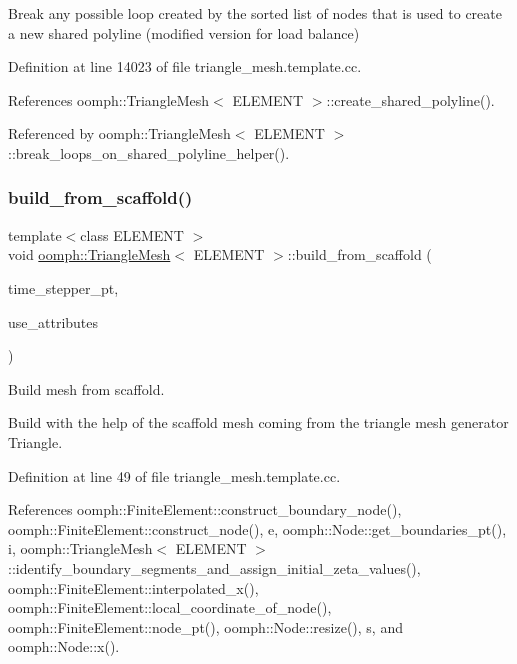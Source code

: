 Break any possible loop created by the sorted list of nodes that is used to create a new shared polyline (modified version for load balance) 



Definition at line 14023 of file triangle\+\_\+mesh.\+template.\+cc.



References oomph\+::\+Triangle\+Mesh$<$ E\+L\+E\+M\+E\+N\+T $>$\+::create\+\_\+shared\+\_\+polyline().



Referenced by oomph\+::\+Triangle\+Mesh$<$ E\+L\+E\+M\+E\+N\+T $>$\+::break\+\_\+loops\+\_\+on\+\_\+shared\+\_\+polyline\+\_\+helper().

\mbox{\label{classoomph_1_1TriangleMesh_a82ccf74f4e2befe3a6acd458d4e37c35}} 
\subsubsection{\texorpdfstring{build\+\_\+from\+\_\+scaffold()}{build\_from\_scaffold()}}
{\footnotesize\ttfamily template$<$class E\+L\+E\+M\+E\+NT $>$ \\
void \hyperlink{classoomph_1_1TriangleMesh}{oomph\+::\+Triangle\+Mesh}$<$ E\+L\+E\+M\+E\+NT $>$\+::build\+\_\+from\+\_\+scaffold (\begin{DoxyParamCaption}\item[{\hyperlink{classoomph_1_1TimeStepper}{Time\+Stepper} $\ast$}]{time\+\_\+stepper\+\_\+pt,  }\item[{const bool \&}]{use\+\_\+attributes }\end{DoxyParamCaption})\hspace{0.3cm}{\ttfamily [protected]}}



Build mesh from scaffold. 

Build with the help of the scaffold mesh coming from the triangle mesh generator Triangle. 

Definition at line 49 of file triangle\+\_\+mesh.\+template.\+cc.



References oomph\+::\+Finite\+Element\+::construct\+\_\+boundary\+\_\+node(), oomph\+::\+Finite\+Element\+::construct\+\_\+node(), e, oomph\+::\+Node\+::get\+\_\+boundaries\+\_\+pt(), i, oomph\+::\+Triangle\+Mesh$<$ E\+L\+E\+M\+E\+N\+T $>$\+::identify\+\_\+boundary\+\_\+segments\+\_\+and\+\_\+assign\+\_\+initial\+\_\+zeta\+\_\+values(), oomph\+::\+Finite\+Element\+::interpolated\+\_\+x(), oomph\+::\+Finite\+Element\+::local\+\_\+coordinate\+\_\+of\+\_\+node(), oomph\+::\+Finite\+Element\+::node\+\_\+pt(), oomph\+::\+Node\+::resize(), s, and oomph\+::\+Node\+::x().

